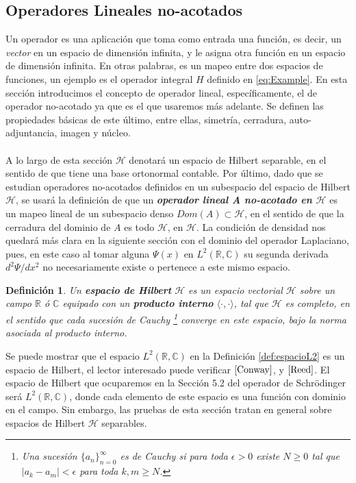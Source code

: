 \documentclass[12pt]{article}
\newtheorem{defn}[teo]{Definición}
\theoremstyle{definition}
\newcommand*{\field}[1]{\mathbb{#1}}
\begin{document}
\subsection{Operadores Lineales no-acotados}
\noindent
Un operador es una aplicación que toma como entrada una función, es decir, un \textit{vector} en un espacio de dimensión infinita, y le asigna otra función en un espacio de dimensión infinita. En otras palabras, es un mapeo entre dos espacios de funciones, un ejemplo es el operador integral $H$ definido en \eqref{eq:Example}. 
En esta sección introducimos el concepto de operador lineal, específicamente, el de operador no-acotado ya que es el que usaremos más adelante. Se definen las propiedades básicas de este último, entre ellas, simetría, cerradura, auto-adjuntancia, imagen y núcleo.
\\ \\
A lo largo de esta sección $\mathcal{H}$ denotará un espacio de Hilbert separable, en el sentido de que tiene una base ortonormal contable. Por último, dado que se estudian operadores no-acotados definidos en un subespacio del espacio de Hilbert $\mathcal{H}$, se usará la definición de que un \textbf{\emph{operador lineal A no-acotado  en $\mathcal{H}$}} es un mapeo lineal de un subespacio denso $Dom(A) \subset \mathcal{H}$, en el sentido de que la cerradura del dominio de $A$ es todo $\mathcal{H}$, en $\mathcal{H}$. La condición de densidad nos quedará más clara en la siguiente sección con el dominio del operador Laplaciano, pues, en este caso al tomar alguna $\Psi(x)$ en $L^{2}(\field{R},\field{C})$ su segunda derivada $d^2\Psi/dx^2$ no necesariamente existe o pertenece a este mismo espacio.
\begin{defn}
    Un \textbf{espacio de Hilbert} $\mathcal{H}$ es un espacio vectorial $\mathcal{H}$ sobre un campo $\field{R}$ ó $\field{C}$ equipado con un \textbf{producto interno} $\langle\cdot,\cdot \rangle$, tal que $\mathcal{H}$ es completo, en el sentido que cada sucesión de Cauchy \footnote{Una sucesión $\{a_{n}\}_{n=0}^{\infty}$ es de Cauchy si para toda $\epsilon > 0$ existe $N\geq 0$ tal que \\ $|a_{k}-a_{m}|<\epsilon$ para toda $k,m\geq N$. } converge en este espacio, bajo la norma asociada al producto interno.
\end{defn}
\noindent
Se puede mostrar que el espacio $L^2(\field{R},\field{C})$ en la Definición \ref{def:espacioL2} es un espacio de Hilbert, el lector interesado puede verificar $\cite[\text{p.4}]{Conway}$, y $\cite[\text{p.40}]{Reed}$. El espacio de Hilbert que ocuparemos en la Sección 5.2 del operador de Schrödinger será $L^2(\field{R},\field{C})$, donde cada elemento de este espacio es una función con dominio en el campo. Sin embargo, las pruebas de esta sección tratan en general sobre espacios de Hilbert $\mathcal{H}$ separables.
\end{document}
